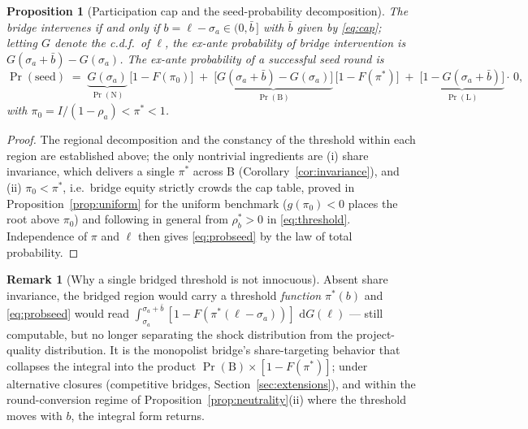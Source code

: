 \documentclass[11pt]{article}
\newtheorem{proposition}{Proposition}
\theoremstyle{definition}
\newtheorem{remark}{Remark}
\newcommand{\Prob}{\Pr}
\newcommand{\dd}{\,\mathrm{d}}
\begin{document}
\begin{proposition}[Participation cap and the seed-probability decomposition]\label{prop:participation}
The bridge intervenes if and only if $b=\ell-\sigma_a \in (0, \bar b\,]$ with $\bar b$ given by \eqref{eq:cap}; letting $G$ denote the c.d.f.\ of $\ell$, the ex-ante probability of bridge intervention is $G(\sigma_a+\bar b)-G(\sigma_a)$. The ex-ante probability of a successful seed round is
\begin{equation}
\Prob(\text{seed})
\;=\;
\underbrace{G(\sigma_a)}_{\Prob(\mathrm{N})}\,\bigl[1-F(\pi_0)\bigr]
\;+\;
\underbrace{\bigl[G(\sigma_a+\bar b) - G(\sigma_a)\bigr]}_{\Prob(\mathrm{B})}\,\bigl[1-F(\pi^{*})\bigr]
\;+\;
\underbrace{\bigl[1-G(\sigma_a+\bar b)\bigr]}_{\Prob(\mathrm{L})}\cdot\, 0,
\label{eq:probseed}
\end{equation}
with $\pi_0 = I/(1-\rho_a) < \pi^{*} < 1$.
\end{proposition}

\begin{proof}
The regional decomposition and the constancy of the threshold within each region are established above; the only nontrivial ingredients are (i) share invariance, which delivers a single $\pi^{*}$ across B (Corollary~\ref{cor:invariance}), and (ii) $\pi_0<\pi^{*}$, i.e.\ bridge equity strictly crowds the cap table, proved in Proposition~\ref{prop:uniform} for the uniform benchmark ($g(\pi_0)<0$ places the root above $\pi_0$) and following in general from $\rho_b^{*}>0$ in \eqref{eq:threshold}. Independence of $\pi$ and $\ell$ then gives \eqref{eq:probseed} by the law of total probability.
\end{proof}

\begin{remark}[Why a single bridged threshold is not innocuous]
Absent share invariance, the bridged region would carry a threshold \emph{function} $\pi^{*}(b)$ and \eqref{eq:probseed} would read $\int_{\sigma_a}^{\sigma_a+\bar b}[1-F(\pi^{*}(\ell-\sigma_a))]\,\dd G(\ell)$ --- still computable, but no longer separating the shock distribution from the project-quality distribution. It is the monopolist bridge's share-targeting behavior that collapses the integral into the product $\Prob(\mathrm{B})\times[1-F(\pi^{*})]$; under alternative closures (competitive bridges, Section~\ref{sec:extensions}), and within the round-conversion regime of Proposition~\ref{prop:neutrality}(ii) where the threshold moves with $b$, the integral form returns.
\end{remark}
\end{document}
